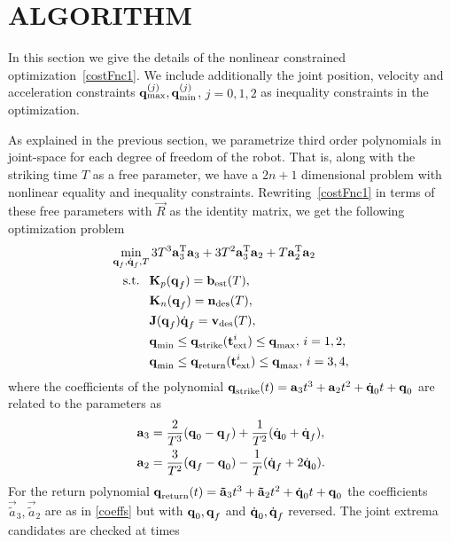 \section{ALGORITHM}\label{alg}

In this section we give the details of the nonlinear constrained optimization~\eqref{costFnc1}. We include additionally the joint position, velocity and acceleration constraints $\boldsymbol{\mathrm{q}}_{\mathrm{max}}^{(j)}, \boldsymbol{\mathrm{q}}_{\mathrm{min}}^{(j)}$, $j = 0, 1, 2$ as inequality constraints in the optimization.

As explained in the previous section, we parametrize third order polynomials in joint-space for each degree of freedom of the robot. That is, along with the striking time $T$ as a free parameter, we have a $2n+1$ dimensional problem with nonlinear equality and inequality constraints. Rewriting~\eqref{costFnc1} in terms of these free parameters with $\vec{R}$ as the identity matrix, we get the following optimization problem
%
\begin{align}
\min_{\boldsymbol{\mathrm{q}}_f,\dot{\boldsymbol{\mathrm{q}}}_f, T} & \, 3T^3 \boldsymbol{\mathrm{a}}_3^{\mathrm{T}}\boldsymbol{\mathrm{a}}_3 + 3T^2 \boldsymbol{\mathrm{a}}_3^{\mathrm{T}}\boldsymbol{\mathrm{a}}_2 + T\boldsymbol{\mathrm{a}}_2^{\mathrm{T}}\boldsymbol{\mathrm{a}}_2 \label{costFnc3} \\
\textrm{s.t. \ }
& \boldsymbol{\mathrm{K}}_p(\boldsymbol{\mathrm{q}}_f) = \boldsymbol{\mathrm{b}}_{\mathrm{est}}(T), \\
& \boldsymbol{\mathrm{K}}_n(\boldsymbol{\mathrm{q}}_f) = \boldsymbol{\mathrm{n}}_{\mathrm{des}}(T), \\
&\boldsymbol{\mathrm{J}}(\boldsymbol{\mathrm{q}}_f)\dot{\boldsymbol{\mathrm{q}}}_f = \boldsymbol{\mathrm{v}}_{\mathrm{des}}(T), \\
& \boldsymbol{\mathrm{q}}_{\mathrm{min}} \leq \boldsymbol{\mathrm{q}}_{\mathrm{strike}}(\boldsymbol{\mathrm{t}}_{\mathrm{ext}}^{i}) \leq \boldsymbol{\mathrm{q}}_{\mathrm{max}}, \, i = 1,2, \\
& \boldsymbol{\mathrm{q}}_{\mathrm{min}} \leq \boldsymbol{\mathrm{q}}_{\mathrm{return}}(\boldsymbol{\mathrm{t}}_{\mathrm{ext}}^{i}) \leq \boldsymbol{\mathrm{q}}_{\mathrm{max}}, \, i = 3,4,
\end{align}
%
\noindent where the coefficients of the polynomial $\boldsymbol{\mathrm{q}}_{\mathrm{strike}}(t) = \boldsymbol{\mathrm{a}}_3 t^3  + \boldsymbol{\mathrm{a}}_2 t^2 + \dot{\boldsymbol{\mathrm{q}}}_0 t + \boldsymbol{\mathrm{q}}_0$ are related to the parameters as 
%
\begin{align}
\boldsymbol{\mathrm{a}}_3 &= \frac{2}{T^3}(\boldsymbol{\mathrm{q}}_0 - \boldsymbol{\mathrm{q}}_f) + \frac{1}{T^2}(\dot{\boldsymbol{\mathrm{q}}}_0 + \dot{\boldsymbol{\mathrm{q}}}_f), \\
\boldsymbol{\mathrm{a}}_2 &= \frac{3}{T^2}(\boldsymbol{\mathrm{q}}_f - \boldsymbol{\mathrm{q}}_0) - \frac{1}{T}(\dot{\boldsymbol{\mathrm{q}}}_f + 2\dot{\boldsymbol{\mathrm{q}}}_0).
\label{coeffs}
\end{align}
%
For the return polynomial $\boldsymbol{\mathrm{q}}_{\mathrm{return}}(t) = \boldsymbol{\mathrm{\tilde{a}}}_3 t^3  + \boldsymbol{\mathrm{\tilde{a}}}_2 t^2 + \dot{\boldsymbol{\mathrm{q}}}_0 t + \boldsymbol{\mathrm{q}}_0$ the coefficients $\vec{\tilde{a}}_3, \vec{\tilde{a}}_2$ are as in \eqref{coeffs} but with $\boldsymbol{\mathrm{q}}_0, \boldsymbol{\mathrm{q}}_f$ and $\dot{\boldsymbol{\mathrm{q}}}_0, \dot{\boldsymbol{\mathrm{q}}}_f$ reversed. The joint extrema candidates are checked at times
